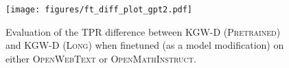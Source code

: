 \begin{figure}[t]
    \centering
    \texttt{[image: figures/ft\_diff\_plot\_gpt2.pdf]}
    \caption{Evaluation of the TPR difference between \textsc{KGW-D (Pretrained)} and \textsc{KGW-D (Long)} when finetuned (as a model modification) on either \textsc{OpenWebText} or \textsc{OpenMathInstruct}.}
    \label{fig:ft_tpr_gpt2_scratch}
\end{figure}
